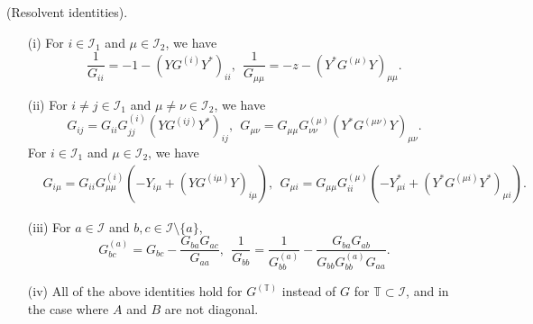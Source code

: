 
\begin{lemma}{(Resolvent identities).}

\begin{itemize}
\item[(i)]
For $i\in \mathcal I_1$ and $\mu\in \mathcal I_2$, we have
\begin{equation}
\frac{1}{{G_{ii} }} =  - 1 - \left( {YG^{\left( i \right)} Y^*} \right)_{ii} ,\ \ \frac{1}{{G_{\mu \mu } }} =  - z  - \left( {Y^*  G^{\left( \mu  \right)} Y} \right)_{\mu \mu }.\label{resolvent2}
\end{equation}

 \item[(ii)]
 For $i\ne j \in \mathcal I_1$ and $\mu \ne \nu \in \mathcal I_2$, we have
\begin{equation}
G_{ij}   = G_{ii} G_{jj}^{\left( i \right)} \left( {YG^{\left( {ij} \right)} Y^* } \right)_{ij},\ \ G_{\mu \nu }  = G_{\mu \mu } G_{\nu \nu }^{\left( \mu  \right)} \left( {Y^*  G^{\left( {\mu \nu } \right)} Y} \right)_{\mu \nu }. \label{resolvent3}
\end{equation}
For $i\in \mathcal I_1$ and $\mu\in \mathcal I_2$, we have
\begin{equation}\label{resolvent6}
\begin{split}
& G_{i\mu } = G_{ii} G_{\mu \mu }^{\left( i \right)} \left( { - Y_{i\mu }  +  {\left( {YG^{\left( {i\mu } \right)} Y} \right)_{i\mu } } } \right), \ \  G_{\mu i}  = G_{\mu \mu } G_{ii}^{\left( \mu  \right)} \left( { - Y_{\mu i}^*  + \left( {Y^*  G^{\left( {\mu i} \right)} Y^*  } \right)_{\mu i} } \right).
\end{split}
\end{equation}

 \item[(iii)]
 For $a \in \mathcal I$ and $b, c \in \mathcal I \setminus \{a\}$,
\begin{equation}
G_{bc}^{\left( a \right)}  = G_{bc}  - \frac{G_{ba} G_{ac}}{G_{aa}}, \ \ \frac{1}{{G_{bb} }} = \frac{1}{{G_{bb}^{(a)} }} - \frac{{G_{ba} G_{ab} }}{{G_{bb} G_{bb}^{(a)} G_{aa} }}. \label{resolvent8}
\end{equation}

 \item[(iv)]
All of the above identities hold for $G^{(\mathbb T)}$ instead of $G$ for $\mathbb T \subset \mathcal I$, and in the case where $A$ and $B$ are not diagonal.
\end{itemize}
\label{lemm_resolvent}
\end{lemma}
